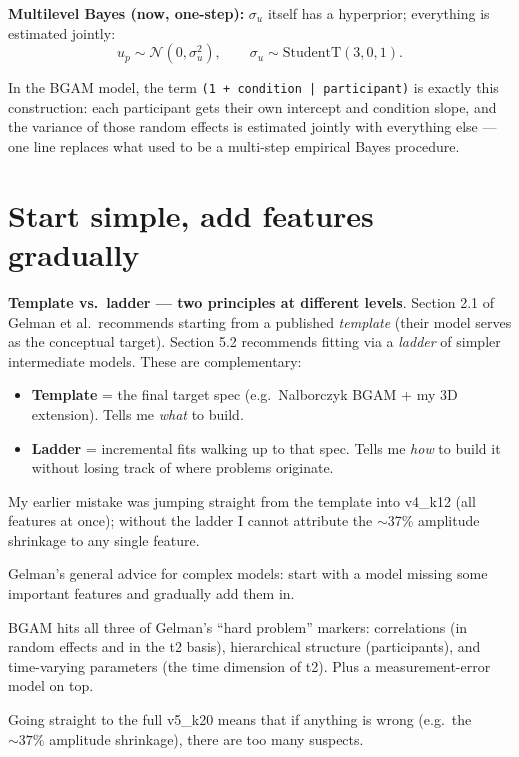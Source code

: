\documentclass[11pt,a4paper]{article}
\begin{document}
\textbf{Multilevel Bayes (now, one-step):}
$\sigma_u$ itself has a hyperprior; everything is estimated jointly:
\[
    u_p \sim \mathcal{N}(0, \sigma_u^2),
    \qquad
    \sigma_u \sim \text{StudentT}(3, 0, 1).
\]

\medskip
\noindent In the BGAM model, the term
\texttt{(1 + condition | participant)} is exactly this construction:
each participant gets their own intercept and condition slope, and the
variance of those random effects is estimated jointly with everything
else --- one line replaces what used to be a multi-step empirical
Bayes procedure.

\section*{Start simple, add features gradually}

\textbf{Template vs.\ ladder --- two principles at different levels}.
Section 2.1 of Gelman et al.\ recommends starting from a published
\emph{template} (their model serves as the conceptual target).
Section 5.2 recommends fitting via a \emph{ladder} of simpler
intermediate models. These are complementary:

\begin{itemize}\setlength{\itemsep}{0pt}
    \item \textbf{Template} = the final target spec (e.g.\ Nalborczyk
          BGAM + my 3D extension). Tells me \emph{what} to build.
    \item \textbf{Ladder} = incremental fits walking up to that spec.
          Tells me \emph{how} to build it without losing track of
          where problems originate.
\end{itemize}

\noindent My earlier mistake was jumping straight from the template
into v4\_k12 (all features at once); without the ladder I cannot
attribute the $\sim$37\% amplitude shrinkage to any single feature.

\medskip
\noindent Gelman's general advice for complex models: start with a
model missing some important features and gradually add them in.

BGAM hits all three of Gelman's ``hard problem'' markers:
correlations (in random effects and in the t2 basis), hierarchical
structure (participants), and time-varying parameters (the time
dimension of t2). Plus a measurement-error model on top.

Going straight to the full v5\_k20 means that if anything is wrong
(e.g.\ the $\sim 37\%$ amplitude shrinkage), there are too many
suspects.
\end{document}
